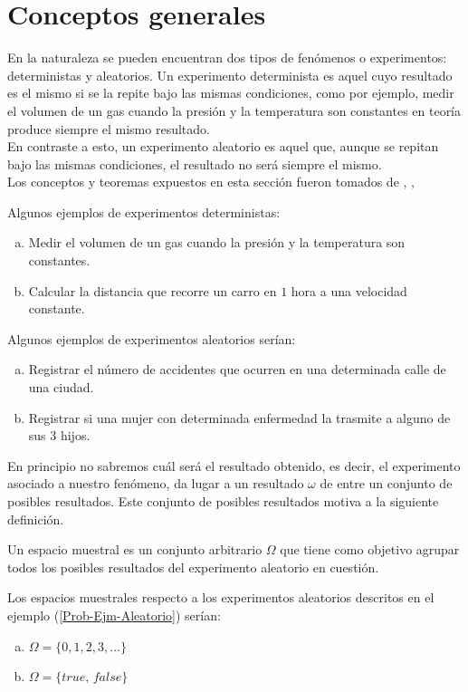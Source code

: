 \section{Conceptos generales}
    En la naturaleza se pueden encuentran dos tipos de fenómenos o experimentos: deterministas y aleatorios. Un experimento determinista es aquel cuyo resultado es el mismo si se la repite bajo las mismas condiciones, como por ejemplo, medir el volumen de un gas cuando la presión y la temperatura son constantes en teoría produce siempre el mismo resultado.\\
    En contraste a esto, un experimento aleatorio es aquel que, aunque se repitan bajo las mismas condiciones, el resultado no será siempre el mismo.\\
    Los conceptos y teoremas expuestos en esta sección fueron tomados de \cite{intro-probabilidad}, \cite{Feller}, \cite{Rincon1} \cite{Rincon2}
\begin{Ejm}
    Algunos ejemplos de experimentos deterministas:
    \begin{enumerate}[a)]
        \item Medir el volumen de un gas cuando la presión y la temperatura son constantes.
        \item Calcular la distancia que recorre un carro en $1$ hora a una velocidad constante.
    \end{enumerate}
\end{Ejm}
\begin{Ejm}
\label{Prob-Ejm-Aleatorio}
Algunos ejemplos de experimentos aleatorios serían:
    \begin{enumerate}[a)]
        \item Registrar el número de accidentes que ocurren en una determinada calle de una ciudad.
        \item Registrar si una mujer con  determinada enfermedad la trasmite a alguno de sus 3 hijos.
    \end{enumerate}
\end{Ejm}
En principio no sabremos cuál será el resultado obtenido, es decir, el experimento asociado a nuestro fenómeno, da lugar a un resultado $\omega$ de entre un conjunto de posibles resultados. Este conjunto de posibles resultados motiva a la siguiente definición.
\begin{Def}
Un espacio muestral es un conjunto arbitrario $\Omega$ que tiene como objetivo agrupar todos los posibles resultados del experimento aleatorio en cuestión.
\end{Def}
\begin{Ejm}
Los espacios muestrales respecto a los experimentos aleatorios descritos en el ejemplo (\ref{Prob-Ejm-Aleatorio}) serían:
\begin{enumerate}[a)]
    \item $\Omega=\{0,1,2,3,\ldots\}$
    \item $\Omega=\{\textit{true, false}\}$
\end{enumerate}
\end{Ejm}
